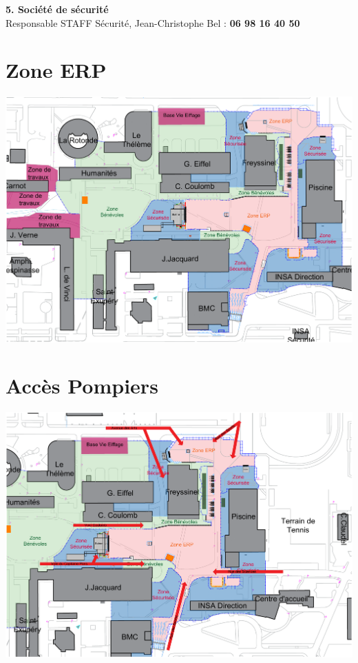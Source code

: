 \documentclass[hidelinks, paper=a4, fontsize=13pt]{report}
\begin{document}
\textbf{5. Société de sécurité}\\
Responsable STAFF Sécurité, Jean-Christophe Bel : \textbf{06 98 16 40 50}\\


\section{Zone ERP}
	
	\begin{center}\includegraphics[width=.95\textheight,angle=90]{Exports/Plan_24h_44eme-Plan_ERP}\end{center}
	

\section{Accès Pompiers}
	\begin{center}\includegraphics[width=.95\textheight,angle=90]{Exports/Plan_24h_44eme-Acces_Pompiers}\end{center}
\end{document}
